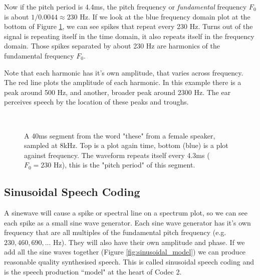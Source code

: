 \documentclass{article}
\begin{document}
Now if the pitch period is 4.4ms, the pitch frequency or \emph{fundamental} frequency $F_0$ is about $1/0.0044 \approx 230$ Hz.  If we look at the blue frequency domain plot at the bottom of Figure \ref{fig:hts2a_time}, we can see spikes that repeat every 230 Hz.  Turns out of the signal is repeating itself in the time domain, it also repeats itself in the frequency domain.  Those spikes separated by about 230 Hz are harmonics of the fundamental frequency $F_0$.

Note that each harmonic has it's own amplitude, that varies across frequency.  The red line plots the amplitude of each harmonic. In this example there is a peak around 500 Hz, and another, broader peak around 2300 Hz.  The ear perceives speech by the location of these peaks and troughs.

\begin{figure}
\caption{ A 40ms segment from the word "these" from a female speaker, sampled at 8kHz. Top is a plot again time, bottom (blue) is a plot against frequency. The waveform repeats itself every 4.3ms ($F_0=230$ Hz), this is the "pitch period" of this segment.}
\label{fig:hts2a_time}
\begin{center}

\\

\end{center}
\end{figure}

\subsection{Sinusoidal Speech Coding}

A sinewave will cause a spike or spectral line on a spectrum plot, so we can see each spike as a small sine wave generator.  Each sine wave generator has it's own frequency that are all multiples of the fundamental pitch frequency (e.g. $230, 460, 690,...$ Hz).  They will also have their own amplitude and phase.  If we add all the sine waves together (Figure \ref{fig:sinusoidal_model}) we can produce reasonable quality synthesised speech.  This is called sinusoidal speech coding and is the speech production ``model" at the heart of Codec 2.
\end{document}
